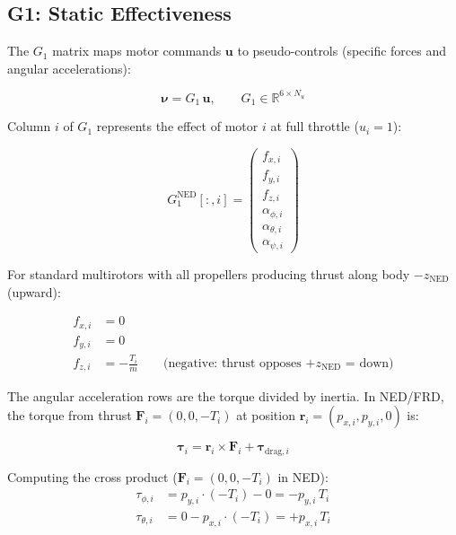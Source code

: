 \documentclass[11pt]{article}
\newcommand{\ned}{\mathrm{NED}}
\begin{document}
\subsection{G1: Static Effectiveness}

The $G_1$ matrix maps motor commands $\bm{u}$ to pseudo-controls
(specific forces and angular accelerations):

\begin{equation}
    \bm{\nu} = G_1 \, \bm{u}, \qquad
    G_1 \in \mathbb{R}^{6 \times N_u}
\end{equation}

Column $i$ of $G_1$ represents the effect of motor $i$ at full throttle ($u_i = 1$):

\begin{equation}\label{eq:g1_ned}
    G_1^{\ned}[:,i] = \begin{pmatrix}
        f_{x,i} \\[2pt] f_{y,i} \\[2pt] f_{z,i} \\[6pt]
        \alpha_{\phi,i} \\[2pt] \alpha_{\theta,i} \\[2pt] \alpha_{\psi,i}
    \end{pmatrix}
\end{equation}

For standard multirotors with all propellers producing thrust along body $-z_\ned$ (upward):

\begin{align}
    f_{x,i} &= 0 \label{eq:g1_fx_ned} \\
    f_{y,i} &= 0 \\
    f_{z,i} &= -\frac{T_i}{m} \qquad \text{(negative: thrust opposes $+z_\ned$ = down)} \label{eq:g1_fz_ned}
\end{align}

The angular acceleration rows are the torque divided by inertia.
In NED/FRD, the torque from thrust $\bm{F}_i = (0, 0, -T_i)$ at position
$\bm{r}_i = (p_{x,i}, p_{y,i}, 0)$ is:

\begin{equation}
    \bm{\tau}_i = \bm{r}_i \times \bm{F}_i + \bm{\tau}_{\mathrm{drag},i}
\end{equation}

Computing the cross product ($\bm{F}_i = (0, 0, -T_i)$ in NED):
\begin{align}
    \tau_{\phi,i}   &= p_{y,i} \cdot (-T_i) - 0 = -p_{y,i} \, T_i \\
    \tau_{\theta,i} &= 0 - p_{x,i} \cdot (-T_i) = +p_{x,i} \, T_i
\end{align}
\end{document}
